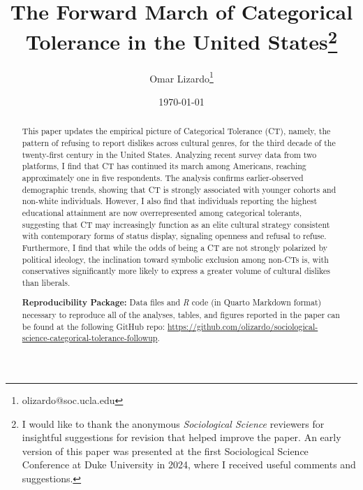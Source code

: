 \documentclass[12pt]{article}
\begin{document}
\title{The Forward March of Categorical Tolerance in the United States\thanks{I would like to thank the anonymous \textit{Sociological Science} reviewers for insightful suggestions for revision that helped improve the paper. An early version of this paper was presented at the first Sociological Science Conference at Duke University in 2024, where I received useful comments and suggestions.}}
\author[1]{Omar Lizardo\thanks{olizardo@soc.ucla.edu}}


\date{\normalsize \today}	
\maketitle

\newpage
\begin{abstract}
This paper updates the empirical picture of Categorical Tolerance (CT), namely, the pattern of refusing to report dislikes across cultural genres, for the third decade of the twenty-first century in the United States. Analyzing recent survey data from two platforms, I find that CT has continued its march among Americans, reaching approximately one in five respondents. The analysis confirms earlier-observed demographic trends, showing that CT is strongly associated with younger cohorts and non-white individuals. However, I also find that individuals reporting the highest educational attainment are now overrepresented among categorical tolerants, suggesting that CT may increasingly function as an elite cultural strategy consistent with contemporary forms of status display, signaling openness and refusal to refuse. Furthermore, I find that while the odds of being a CT are not strongly polarized by political ideology, the inclination toward symbolic exclusion among non-CTs is, with conservatives significantly more likely to express a greater volume of cultural dislikes than liberals. 

\textbf{Reproducibility Package:} Data files and \textit{R} code (in Quarto Markdown format) necessary to reproduce all of the analyses, tables, and figures reported in the paper can be found at the following GitHub repo: \url{https://github.com/olizardo/sociological-science-categorical-tolerance-followup}.
\end{abstract}
\newpage
\end{document}
